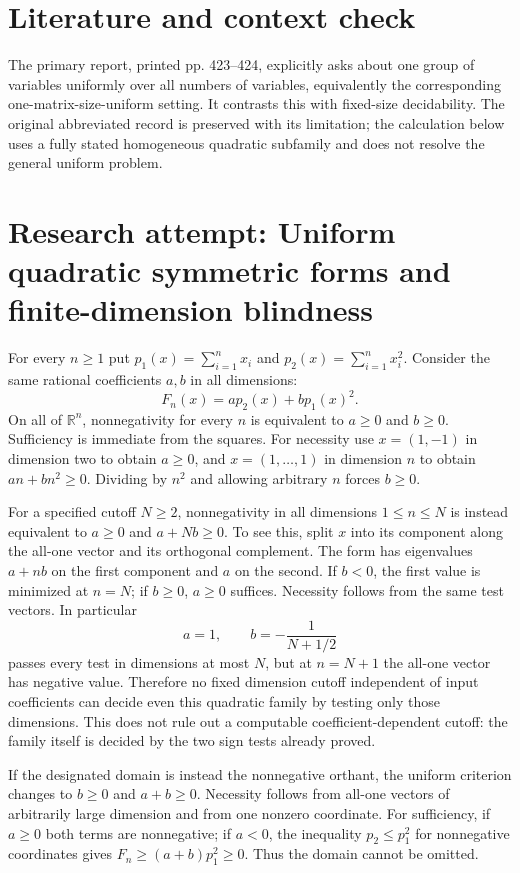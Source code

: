 \documentclass[11pt]{article}
\begin{document}
\section{Literature and context check}
The primary report, printed pp. 423--424, explicitly asks about one group of variables uniformly over all numbers of variables, equivalently the corresponding one-matrix-size-uniform setting. It contrasts this with fixed-size decidability. The original abbreviated record is preserved with its limitation; the calculation below uses a fully stated homogeneous quadratic subfamily and does not resolve the general uniform problem.
\section{Research attempt: Uniform quadratic symmetric forms and finite-dimension blindness}

For every $n\geq1$ put $p_1(x)=\sum_{i=1}^n x_i$ and $p_2(x)=\sum_{i=1}^n x_i^2$. Consider the same rational coefficients $a,b$ in all dimensions:
\[
F_n(x)=a p_2(x)+b p_1(x)^2.
\]
On all of $\mathbb R^n$, nonnegativity for every $n$ is equivalent to $a\geq0$ and $b\geq0$. Sufficiency is immediate from the squares. For necessity use $x=(1,-1)$ in dimension two to obtain $a\geq0$, and $x=(1,\ldots,1)$ in dimension $n$ to obtain $an+bn^2\geq0$. Dividing by $n^2$ and allowing arbitrary $n$ forces $b\geq0$.

For a specified cutoff $N\geq2$, nonnegativity in all dimensions $1\leq n\leq N$ is instead equivalent to $a\geq0$ and $a+Nb\geq0$. To see this, split $x$ into its component along the all-one vector and its orthogonal complement. The form has eigenvalues $a+nb$ on the first component and $a$ on the second. If $b<0$, the first value is minimized at $n=N$; if $b\geq0$, $a\geq0$ suffices. Necessity follows from the same test vectors. In particular
\[
a=1,\qquad b=-\frac1{N+1/2}
\]
passes every test in dimensions at most $N$, but at $n=N+1$ the all-one vector has negative value. Therefore no fixed dimension cutoff independent of input coefficients can decide even this quadratic family by testing only those dimensions. This does not rule out a computable coefficient-dependent cutoff: the family itself is decided by the two sign tests already proved.

If the designated domain is instead the nonnegative orthant, the uniform criterion changes to $b\geq0$ and $a+b\geq0$. Necessity follows from all-one vectors of arbitrarily large dimension and from one nonzero coordinate. For sufficiency, if $a\geq0$ both terms are nonnegative; if $a<0$, the inequality $p_2\leq p_1^2$ for nonnegative coordinates gives $F_n\geq(a+b)p_1^2\geq0$. Thus the domain cannot be omitted.
\end{document}
